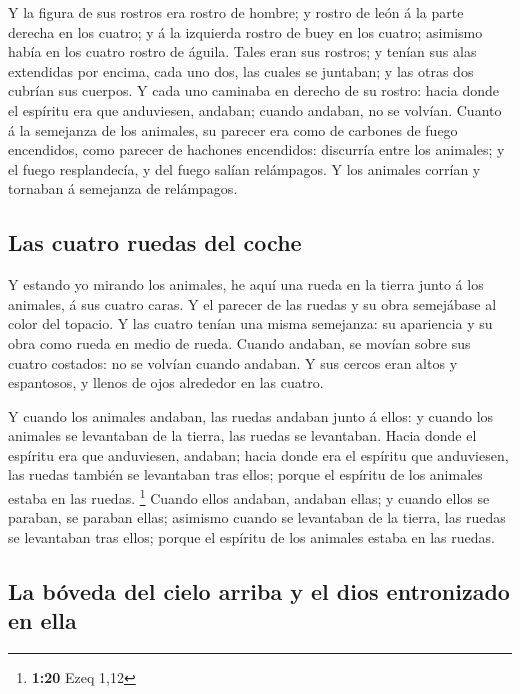  Y la figura de sus rostros era rostro de hombre; y
rostro de león á la parte derecha en los cuatro; y á la izquierda rostro
de buey en los cuatro; asimismo había en los cuatro rostro de águila.
 Tales eran sus rostros; y tenían sus alas extendidas por
encima, cada uno dos, las cuales se juntaban; y las otras dos cubrían
sus cuerpos.  Y cada uno caminaba en derecho de su
rostro: hacia donde el espíritu era que anduviesen, andaban; cuando
andaban, no se volvían.  Cuanto á la semejanza de los
animales, su parecer era como de carbones de fuego encendidos, como
parecer de hachones encendidos: discurría entre los animales; y el fuego
resplandecía, y del fuego salían relámpagos.  Y los
animales corrían y tornaban á semejanza de relámpagos.

\hypertarget{las-cuatro-ruedas-del-coche}{%
\subsection{Las cuatro ruedas del
coche}\label{las-cuatro-ruedas-del-coche}}

 Y estando yo mirando los animales, he aquí una rueda en
la tierra junto á los animales, á sus cuatro caras.  Y el
parecer de las ruedas y su obra semejábase al color del topacio. Y las
cuatro tenían una misma semejanza: su apariencia y su obra como rueda en
medio de rueda.  Cuando andaban, se movían sobre sus
cuatro costados: no se volvían cuando andaban.  Y sus
cercos eran altos y espantosos, y llenos de ojos alrededor en las
cuatro.

 Y cuando los animales andaban, las ruedas andaban junto
á ellos: y cuando los animales se levantaban de la tierra, las ruedas se
levantaban.  Hacia donde el espíritu era que anduviesen,
andaban; hacia donde era el espíritu que anduviesen, las ruedas también
se levantaban tras ellos; porque el espíritu de los animales estaba en
las ruedas. \footnote{\textbf{1:20} Ezeq 1,12}  Cuando
ellos andaban, andaban ellas; y cuando ellos se paraban, se paraban
ellas; asimismo cuando se levantaban de la tierra, las ruedas se
levantaban tras ellos; porque el espíritu de los animales estaba en las
ruedas.

\hypertarget{la-buxf3veda-del-cielo-arriba-y-el-dios-entronizado-en-ella}{%
\subsection{La bóveda del cielo arriba y el dios entronizado en
ella}\label{la-buxf3veda-del-cielo-arriba-y-el-dios-entronizado-en-ella}}

